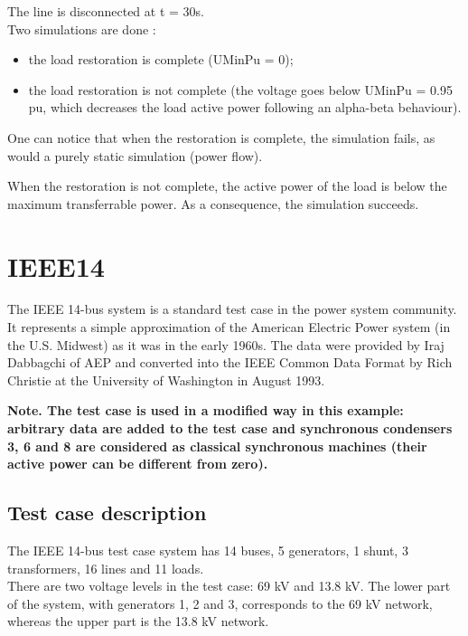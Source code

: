 \documentclass[a4paper, 12pt]{report}
\begin{document}
The line is disconnected at t = 30s.\\
Two simulations are done :
\begin{itemize}
\item the load restoration is complete (UMinPu = 0);
\item the load restoration is not complete (the voltage goes below UMinPu = 0.95 pu, which decreases the load active power following an alpha-beta behaviour).
\end{itemize}

One can notice that when the restoration is complete, the simulation fails, as would a purely static simulation (power flow).

When the restoration is not complete, the active power of the load is below the maximum transferrable power. As a consequence, the simulation succeeds.

\chapter{IEEE14}

The IEEE 14-bus system is a standard test case in the power system community. It represents a simple approximation of the American Electric Power system (in the U.S. Midwest) as it was in the early 1960s. The data were provided by Iraj Dabbagchi of AEP and converted into the IEEE Common Data Format by Rich Christie at the University of Washington in August 1993.

\textbf{Note. The test case is used in a modified way in this example: arbitrary data are added to the test case and synchronous condensers 3, 6 and 8 are considered as classical synchronous machines (their active power can be different from zero).}

\section{Test case description}

The IEEE 14-bus test case system has 14 buses, 5 generators, 1 shunt, 3 transformers, 16 lines and 11 loads.\\
There are two voltage levels in the test case: 69 kV and 13.8 kV. The lower part of the system, with generators 1, 2 and 3, corresponds to the 69 kV network, whereas the upper part is the 13.8 kV network.
\end{document}
